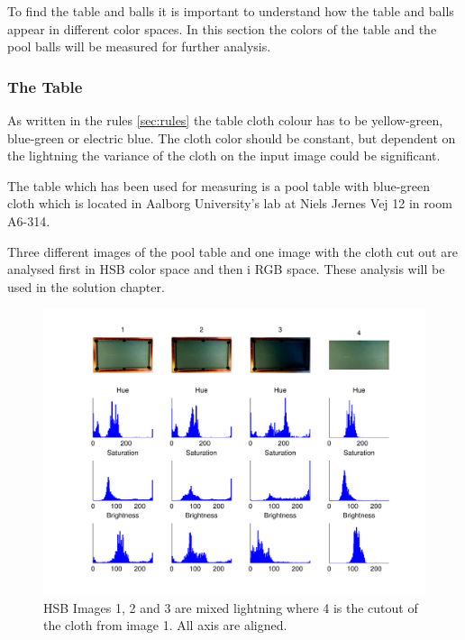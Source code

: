 To find the table and balls it is important to understand how the table and balls appear in different color spaces. In this section the colors of the table and the pool balls will be measured for further analysis.\\

\subsubsection{The Table}
As written in the rules \ref{sec:rules} the table cloth colour has to be yellow-green, blue-green or electric blue. The cloth color should be constant, but dependent on the lightning the variance of the cloth on the input image could be significant.

The table which has been used for measuring is a pool table with blue-green cloth which is located in Aalborg University's lab at Niels Jernes Vej 12 in room A6-314.

Three different images of the pool table and one image with the cloth cut out are analysed first in HSB color space and then i RGB space. These analysis will be used in the solution chapter.

\begin{figure}[H]
\begin{center}
\leavevmode
\includegraphics[width=1\textwidth]{images/hsv_hist_table}
\end{center}
\caption{HSB Images 1, 2 and 3 are mixed lightning where 4 is the cutout of the cloth from image 1. All axis are aligned.}
\label{fig:tableHSB}
\end{figure}

